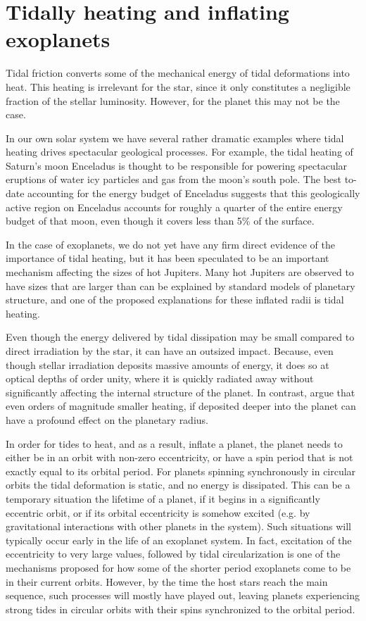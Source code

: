 \section{Tidally heating and inflating exoplanets}

Tidal friction converts some of the mechanical energy of tidal deformations into
heat. This heating is irrelevant for the star, since it only constitutes a
negligible fraction of the stellar luminosity. However, for the planet this may
not be the case.

In our own solar system we have several rather dramatic examples where
tidal heating drives spectacular geological processes. For example, the tidal
heating of Saturn's moon Enceladus is thought to be responsible for powering
spectacular eruptions of water icy particles and gas from the moon's south pole.
The best to-date accounting for the energy budget of Enceladus suggests that
this geologically active region on Enceladus accounts for roughly a quarter of
the entire energy budget of that moon, even though it covers less than 5\% of
the surface.

In the case of exoplanets, we do not yet have any firm direct evidence of the
importance of tidal heating, but it has been speculated to be an important
mechanism affecting the sizes of hot Jupiters. Many hot Jupiters are observed to
have sizes that are larger than can be explained by standard models of planetary
structure, and one of the proposed explanations for these inflated radii is
tidal heating.

Even though the energy delivered by tidal dissipation may be small compared to
direct irradiation by the star, it can have an outsized impact. Because, even
though stellar irradiation deposits massive amounts of energy, it does so at
optical depths of order unity, where it is quickly radiated away without
significantly affecting the internal structure of the planet. In contrast,
\citet{Komacek_Youdin_17} argue that even orders of magnitude smaller heating,
if deposited deeper into the planet can have a profound effect on the planetary
radius.

In order for tides to heat, and as a result, inflate a planet, the planet needs
to either be in an orbit with non-zero eccentricity, or have a spin period that
is not exactly equal to its orbital period. For planets spinning synchronously
in circular orbits the tidal deformation is static, and no energy is dissipated.
This can be a temporary situation the lifetime of a planet, if it begins in a
significantly eccentric orbit, or if its orbital eccentricity is somehow excited
(e.g. by gravitational interactions with other planets in the system). Such
situations will typically occur early in the life of an exoplanet system. In
fact, excitation of the eccentricity to very large values, followed by tidal
circularization is one of the mechanisms proposed for how some of the shorter
period exoplanets come to be in their current orbits. However, by the time the
host stars reach the main sequence, such processes will mostly have played out,
leaving planets experiencing strong tides in circular orbits with their spins
synchronized to the orbital period.


